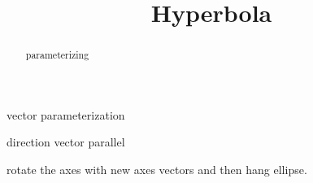 \documentclass{ximera}
\title{Hyperbola}
\begin{document}
\begin{abstract}
parameterizing
\end{abstract}
\maketitle



vector parameterization


direction vector parallel



rotate the axes with new axes vectors and then hang ellipse.
\end{document}
